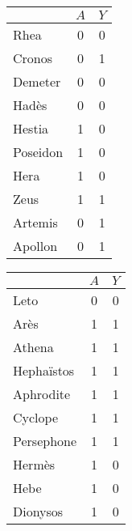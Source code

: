 \documentclass{standalone}
\begin{document}
\begin{multicols}{2}
	\begin{tabular}{l|c|c|}
		& $A $ & $Y$ \\
		\hline
		Rhea & 0 & 0\\
		Cronos & 0 & 1\\
		Demeter &0 & 0\\
		Hadès & 0 & 0\\
		Hestia & 1 & 0\\
		Poseidon & 1 & 0 \\
		Hera & 1 & 0\\
		Zeus & 1 &1 \\
		Artemis & 0 & 1\\
		Apollon& 0 & 1
	\end{tabular}
	\begin{tabular}{l|c|c|}
		& $A $ & $Y$ \\
		\hline
		Leto & 0 & 0\\
		Arès & 1  & 1\\
		Athena & 1  & 1\\
		Hephaïstos & 1  & 1\\
		Aphrodite & 1  & 1 \\
		Cyclope & 1  & 1\\
		Persephone & 1  & 1 \\
		Hermès &1 & 0\\
		Hebe & 1 & 0 \\
		Dionysos & 1 & 0 
	\end{tabular}
\end{multicols}
\end{document}
